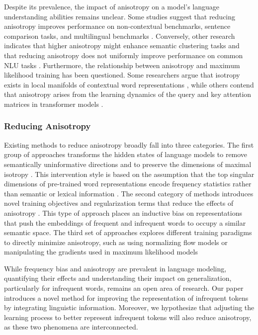 Despite its prevalence, the impact of anisotropy on a model's language understanding abilities remains unclear. Some studies suggest that reducing anisotropy improves performance on non-contextual benchmarks, sentence comparison tasks, and multilingual benchmarks \citep{bis2021too, su2021whitening, rajaee2022isotropy}. Conversely, other research indicates that higher anisotropy might enhance semantic clustering tasks and that reducing anisotropy does not uniformly improve performance on common NLU tasks \citep{ait2023anisotropy, ding2022isotropy}. Furthermore, the relationship between anisotropy and maximum likelihood training has been questioned. Some researchers argue that isotropy exists in local manifolds of contextual word representations \citep{cai2020isotropy}, while others contend that anisotropy arises from the learning dynamics of the query and key attention matrices in transformer models \citep{godey2024anisotropy}.

\subsubsection{Reducing Anisotropy}

Existing methods to reduce anisotropy broadly fall into three categories. The first group of approaches transforms the hidden states of language models to remove semantically uninformative directions and to preserve the dimensions of maximal isotropy \citep{arora2016simple, mu2018all, raunak2019effective, su2021whitening,bis2021too}. This intervention style is based on the assumption that the top singular dimensions of pre-trained word representations encode frequency statistics rather than semantic or lexical information \citep{mu2018all}. The second category of methods introduces novel training objectives and regularization terms that reduce the effects of anisotropy \citep{gong2018frage, gao2018representation, wang2019improving}. This type of approach places an inductive bias on representations that push the embeddings of frequent and infrequent words to occupy a similar semantic space. The third set of approaches explores different training paradigms to directly minimize anisotropy, such as using normalizing flow models \citep{li2020sentence} or manipulating the gradients used in maximum likelihood models \citep{yu2022rare}

\vspace{1em}

While frequency bias and anisotropy are prevalent in language modeling, quantifying their effects and understanding their impact on generalization, particularly for infrequent words, remains an open area of research. Our paper introduces a novel method for improving the representation of infrequent tokens by integrating linguistic information. Moreover, we hypothesize that adjusting the learning process to better represent infrequent tokens will also reduce anisotropy, as these two phenomena are interconnected.

